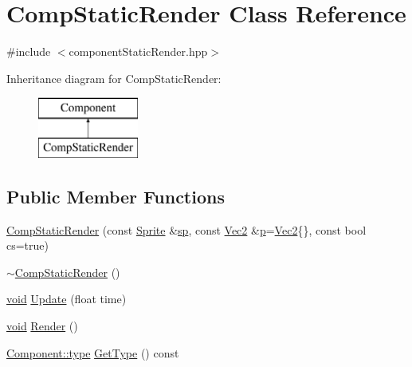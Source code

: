 \hypertarget{class_comp_static_render}{\section{Comp\-Static\-Render Class Reference}
\label{class_comp_static_render}
}


{\ttfamily \#include $<$component\-Static\-Render.\-hpp$>$}

Inheritance diagram for Comp\-Static\-Render\-:\begin{figure}[H]
\begin{center}
\leavevmode
\includegraphics[height=2.000000cm]{class_comp_static_render}
\end{center}
\end{figure}
\subsection*{Public Member Functions}
\begin{DoxyCompactItemize}
\item 
\hyperlink{class_comp_static_render_afe3fe29902002bf6ab74398c76ec00b1}{Comp\-Static\-Render} (const \hyperlink{class_sprite}{Sprite} \&\hyperlink{class_comp_static_render_a0b0396c860cd01d3572b68558e775ef6}{sp}, const \hyperlink{class_vec2}{Vec2} \&\hyperlink{_s_d_l__opengl__glext_8h_aa5367c14d90f462230c2611b81b41d23}{p}=\hyperlink{class_vec2}{Vec2}\{\}, const bool cs=true)
\item 
\hyperlink{class_comp_static_render_a6407e5bbb59d26b4c88c213f10b36fce}{$\sim$\-Comp\-Static\-Render} ()
\item 
\hyperlink{_s_d_l__opengles2__gl2ext_8h_ae5d8fa23ad07c48bb609509eae494c95}{void} \hyperlink{class_comp_static_render_ae48cbdf0b5800c555d7454a3791de2f5}{Update} (float time)
\item 
\hyperlink{_s_d_l__opengles2__gl2ext_8h_ae5d8fa23ad07c48bb609509eae494c95}{void} \hyperlink{class_comp_static_render_a1dee437e9c9c133b8dbbf73fe1a3010d}{Render} ()
\item 
\hyperlink{class_component_ad6d161b6acf7b843b55bb9feac7af71a}{Component\-::type} \hyperlink{class_comp_static_render_af6da06eca12dbf351fd02de3d8228b37}{Get\-Type} () const 
\end{DoxyCompactItemize}
